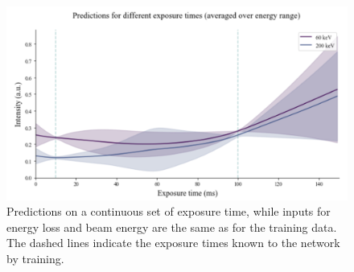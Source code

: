 \begin{figure}[H]
    \centering
    \includegraphics[width=120mm]{plots/Extrapolate_exposuretime.png}
    \caption{Predictions on a continuous set of exposure time, while inputs for energy loss and beam energy are the same as for the training data. The dashed lines indicate the exposure times known to the network by training.}
    \label{fig:extrapolbeam}
\end{figure}
